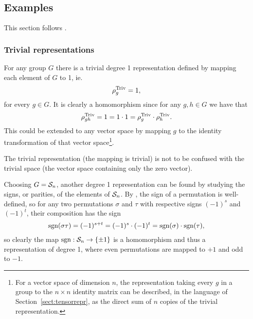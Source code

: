 \subsection{Examples}\label{sect:basicreprs}

This section follows \cite[1.2]{Serre}.

\subsubsection{Trivial representations}


\begin{example}\label{example:trivrepr}
	For any group $G$ there is a trivial degree 1 representation defined by mapping each element of $G$ to 1, ie.
	\begin{align*}
		\rho_g^{\text{Triv}} = 1,
	\end{align*}
	for every $g \in G$. It is clearly a homomorphism since for any $g,h \in G$ we have that
	\begin{align*}
		\rho_{gh}^{\text{Triv}} = 1 = 1 \cdot 1 = \rho_g^{\text{Triv}} \cdot \rho_h^{\text{Triv}}.
	\end{align*}
	This could be extended to any vector space by mapping $g$ to the identity transformation of that vector space\footnote{For a vector space of dimension $n$, the representation taking every $g$ in a group to the $n \times n$ identity matrix can be described, in the language of Section~\ref{sect:tensorrepr}, as the direct sum of $n$ copies of the trivial representation.}.
\end{example}

\begin{note}
	The trivial representation (the mapping is trivial) is not to be confused with the trivial space (the vector space containing only the zero vector).
\end{note}

\begin{example}\label{example:altrepr}
	Choosing $G = \mathcal{S}_n$, another degree 1 representation can be found by studying the signs, or parities, of the elements of $\mathcal{S}_n$. By \cite[Thm.12.6.1.]{Biggs}, the sign of a permutation is well-defined, so for any two permutations $\sigma$ and $\tau$ with respective signs $(-1)^s$ and $(-1)^t$, their composition has the sign
	\begin{align*}
		\text{sgn}(\sigma\tau) = (-1)^{s+t} = (-1)^s \cdot (-1)^t = \text{sgn} (\sigma) \cdot \text{sgn} (\tau),
	\end{align*}
	so clearly the map $\text{sgn}: \mathcal{S}_n \rightarrow \{\pm 1\}$ is a homomorphism and thus a representation of degree 1, where even permutations are mapped to $+1$ and odd to $-1$.
\end{example}


